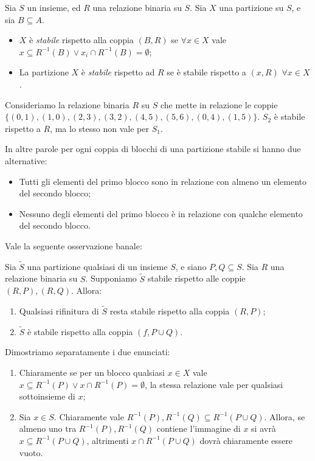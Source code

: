 \begin{definition}
    Sia $S$ un insieme, ed $R$ una relazione binaria su $S$. Sia $X$ una partizione su $S$, e sia $B \subseteq A$.
    \begin{itemize}
        \item $X$ è \emph{stabile} rispetto alla coppia $(B,R)$ se $\forall x \in X$ vale $x \subseteq R^{-1}(B) \lor x_i \cap R^{-1}(B) = \emptyset$;
        \item La partizione $X$ è \emph{stabile} rispetto ad $R$ se è stabile rispetto a $(x,R) \,\,\forall x \in X$.
    \end{itemize}
\end{definition}
\begin{example}
    \label{exa:set_partition_stable}
    Consideriamo la relazione binaria $R$ su $S$ che mette in relazione le coppie $\{(0,1),(1,0),(2,3),(3,2),(4,5),(5,6),(0,4),(1,5)\}$. $S_2$ è stabile rispetto a $R$, ma lo stesso non vale per $S_1$.
\end{example}
In altre parole per ogni coppia di blocchi di una partizione stabile si hanno due alternative:
\begin{itemize}
    \item Tutti gli elementi del primo blocco sono in relazione con almeno un elemento del secondo blocco;
    \item Nessuno degli elementi del primo blocco è in relazione con qualche elemento del secondo blocco.
\end{itemize}
Vale la seguente osservazione banale:
\begin{observation}
    Sia $\widetilde{S}$ una partizione qualsiasi di un insieme $S$, e siano $P,Q \subseteq S$. Sia $R$ una relazione binaria su $S$. Supponiamo $\widetilde{S}$ stabile rispetto alle coppie $(R,P),(R,Q)$. Allora:
    \begin{enumerate}
        \item Qualsiasi rifinitura di $\widetilde{S}$ resta stabile rispetto alla coppia $(R,P)$;
        \item $\widetilde{S}$ è stabile rispetto alla coppia $(f,P \cup Q)$.
    \end{enumerate}
\end{observation}
\begin{proof2}
    Dimostriamo separatamente i due enunciati:
    \begin{enumerate}
        \item Chiaramente se per un blocco qualsiasi $x \in X$ vale $x \subseteq R^{-1}(P) \lor x \cap R^{-1}(P) = \emptyset$, la stessa relazione vale per qualsiasi sottoinsieme di $x$;
        \item Sia $x \in S$. Chiaramente vale $R^{-1}(P),R^{-1}(Q) \subseteq R^{-1}(P \cup Q)$. Allora, se almeno uno tra $R^{-1}(P),R^{-1}(Q)$ contiene l'immagine di $x$ si avrà $x \subseteq R^{-1}(P \cup Q)$, altrimenti $x \cap R^{-1}(P \cup Q)$ dovrà chiaramente essere vuoto.
    \end{enumerate}
    \vspace*{-0.75cm}
\end{proof2}
